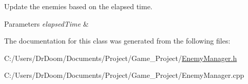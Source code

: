 Update the enemies based on the elapsed time. 


\begin{DoxyParams}{Parameters}
{\em elapsed\+Time} & \\
\hline
\end{DoxyParams}


The documentation for this class was generated from the following files\+:\begin{DoxyCompactItemize}
\item 
C\+:/\+Users/\+Dr\+Doom/\+Documents/\+Project/\+Game\+\_\+\+Project/\hyperlink{_enemy_manager_8h}{Enemy\+Manager.\+h}\item 
C\+:/\+Users/\+Dr\+Doom/\+Documents/\+Project/\+Game\+\_\+\+Project/Enemy\+Manager.\+cpp\end{DoxyCompactItemize}
